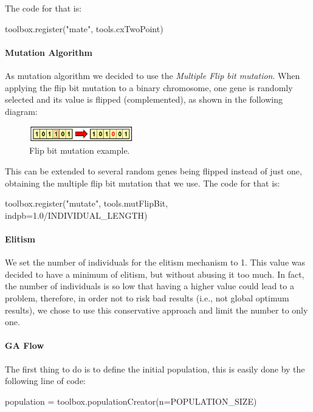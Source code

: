The code for that is:
\begin{python}
toolbox.register("mate", tools.cxTwoPoint)
\end{python}

\paragraph{Mutation Algorithm}
As mutation algorithm we decided to use the \textit{Multiple Flip bit mutation}. When applying the flip bit mutation to a binary chromosome, one gene is randomly selected and its value is flipped (complemented), as shown in the following diagram:

\begin{figure}[H]
	\centering
	\includegraphics[width=0.4\textwidth]{img/flipbit.png}
	\caption{Flip bit mutation example.}
	\label{fig:flipbit}
\end{figure}

This can be extended to several random genes being flipped instead of just one, obtaining the multiple flip bit mutation that we use.
The code for that is:
\begin{python}
toolbox.register("mutate", tools.mutFlipBit, indpb=1.0/INDIVIDUAL_LENGTH)
\end{python}


\paragraph{Elitism}
We set the number of individuals for the elitism mechanism to 1. This value was decided to have a minimum of elitism, but without abusing it too much. In fact, the number of individuals is so low that having a higher value could lead to a problem, therefore, in order not to risk bad results (i.e., not global optimum results), we chose to use this conservative approach and limit the number to only one.

\paragraph{GA Flow}
The first thing to do is to define the initial population, this is easily done by the following line of code:

\begin{python}
population  = toolbox.populationCreator(n=POPULATION_SIZE)
\end{python}

